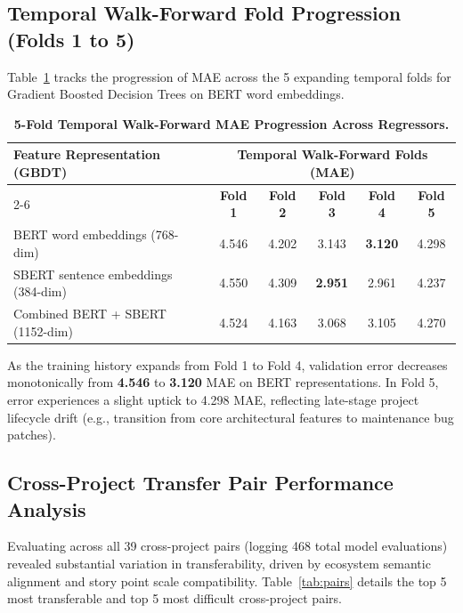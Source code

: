 \documentclass[11pt,a4paper]{article}
\begin{document}
\subsection{Temporal Walk-Forward Fold Progression (Folds 1 to 5)}
Table~\ref{tab:folds} tracks the progression of MAE across the 5 expanding temporal folds for Gradient Boosted Decision Trees on BERT word embeddings.

\begin{table}[H]
\centering
\small
\caption{\textbf{5-Fold Temporal Walk-Forward MAE Progression Across Regressors.}}
\label{tab:folds}
\begin{tabularx}{\linewidth}{@{} X ccccc @{}}
\toprule
\multirow{2}{*}{\textbf{Feature Representation (GBDT)}} & \multicolumn{5}{c}{\textbf{Temporal Walk-Forward Folds (MAE)}} \\
\cmidrule(lr){2-6}
 & \textbf{Fold 1} & \textbf{Fold 2} & \textbf{Fold 3} & \textbf{Fold 4} & \textbf{Fold 5} \\
\midrule
BERT word embeddings (768-dim) & 4.546 & 4.202 & 3.143 & \textbf{3.120} & 4.298 \\
SBERT sentence embeddings (384-dim) & 4.550 & 4.309 & \textbf{2.951} & 2.961 & 4.237 \\
Combined BERT + SBERT (1152-dim) & 4.524 & 4.163 & 3.068 & 3.105 & 4.270 \\
\bottomrule
\end{tabularx}
\end{table}

As the training history expands from Fold 1 to Fold 4, validation error decreases monotonically from \textbf{4.546} to \textbf{3.120} MAE on BERT representations. In Fold 5, error experiences a slight uptick to 4.298 MAE, reflecting late-stage project lifecycle drift (e.g., transition from core architectural features to maintenance bug patches).

\subsection{Cross-Project Transfer Pair Performance Analysis}
Evaluating across all 39 cross-project pairs (logging 468 total model evaluations) revealed substantial variation in transferability, driven by ecosystem semantic alignment and story point scale compatibility. Table~\ref{tab:pairs} details the top 5 most transferable and top 5 most difficult cross-project pairs.
\end{document}
